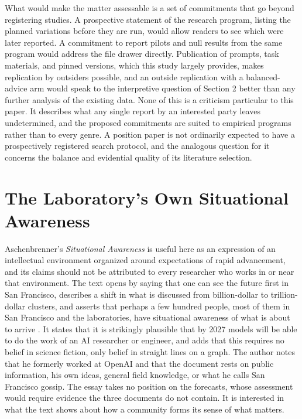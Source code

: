 \documentclass[11pt]{article}
\begin{document}
What would make the matter assessable is a set of commitments that go beyond registering studies. A prospective statement of the research program, listing the planned variations before they are run, would allow readers to see which were later reported. A commitment to report pilots and null results from the same program would address the file drawer directly. Publication of prompts, task materials, and pinned versions, which this study largely provides, makes replication by outsiders possible, and an outside replication with a balanced-advice arm would speak to the interpretive question of Section 2 better than any further analysis of the existing data. None of this is a criticism particular to this paper. It describes what any single report by an interested party leaves undetermined, and the proposed commitments are suited to empirical programs rather than to every genre. A position paper is not ordinarily expected to have a prospectively registered search protocol, and the analogous question for it concerns the balance and evidential quality of its literature selection.

\section{The Laboratory's Own Situational Awareness}

Aschenbrenner's \emph{Situational Awareness} is useful here as an expression of an intellectual environment organized around expectations of rapid advancement, and its claims should not be attributed to every researcher who works in or near that environment. The text opens by saying that one can see the future first in San Francisco, describes a shift in what is discussed from billion-dollar to trillion-dollar clusters, and asserts that perhaps a few hundred people, most of them in San Francisco and the laboratories, have situational awareness of what is about to arrive \cite{aschenbrenner}. It states that it is strikingly plausible that by 2027 models will be able to do the work of an AI researcher or engineer, and adds that this requires no belief in science fiction, only belief in straight lines on a graph. The author notes that he formerly worked at OpenAI and that the document rests on public information, his own ideas, general field knowledge, or what he calls San Francisco gossip. The essay takes no position on the forecasts, whose assessment would require evidence the three documents do not contain. It is interested in what the text shows about how a community forms its sense of what matters.
\end{document}
